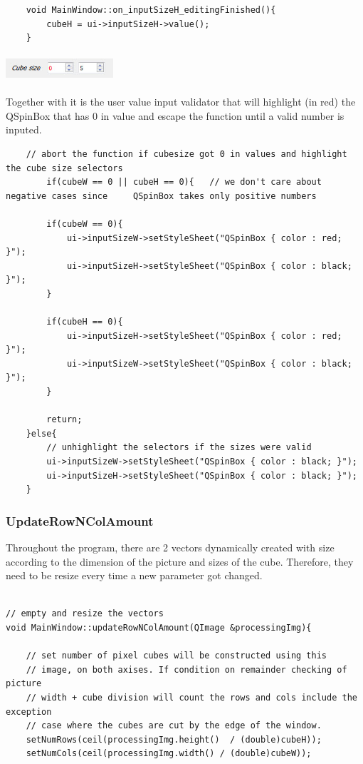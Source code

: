 \documentclass[english]{article}
\begin{document}
{\begin{lstlisting}
	void MainWindow::on_inputSizeH_editingFinished(){
		cubeH = ui->inputSizeH->value();
	}
\end{lstlisting}

\begin{center}
	\includegraphics[width=4cm,height=1cm]{img/validator.jpg}	
\end{center} 

Together with it is the user value input validator that will highlight (in red) the QSpinBox that has 0 in value and escape the function until a valid number is inputed.

\lstset{language=C++}
\begin{lstlisting}
	// abort the function if cubesize got 0 in values and highlight the cube size selectors
		if(cubeW == 0 || cubeH == 0){   // we don't care about negative cases since 	QSpinBox takes only positive numbers
		
		if(cubeW == 0){
			ui->inputSizeW->setStyleSheet("QSpinBox { color : red; }");
			ui->inputSizeH->setStyleSheet("QSpinBox { color : black; }");
		}
		
		if(cubeH == 0){
			ui->inputSizeH->setStyleSheet("QSpinBox { color : red; }");
			ui->inputSizeW->setStyleSheet("QSpinBox { color : black; }");
		}
		
		return;
	}else{
		// unhighlight the selectors if the sizes were valid
		ui->inputSizeW->setStyleSheet("QSpinBox { color : black; }");
		ui->inputSizeH->setStyleSheet("QSpinBox { color : black; }");
	}
\end{lstlisting}


\subsubsection{UpdateRowNColAmount}

Throughout the program, there are 2 vectors dynamically created with size according to the dimension of the picture and sizes of the cube. Therefore, they need to be resize every time a new parameter got changed. 

\lstset{language=C++}

\begin{lstlisting}

// empty and resize the vectors
void MainWindow::updateRowNColAmount(QImage &processingImg){
	
	// set number of pixel cubes will be constructed using this
	// image, on both axises. If condition on remainder checking of picture
	// width + cube division will count the rows and cols include the exception
	// case where the cubes are cut by the edge of the window.
	setNumRows(ceil(processingImg.height()  / (double)cubeH));
	setNumCols(ceil(processingImg.width() / (double)cubeW));
	

\end{lstlisting}}
\end{document}

